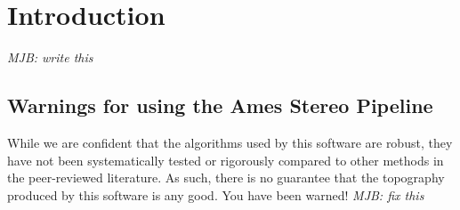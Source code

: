 \chapter{Introduction}

\emph{MJB: write this}

\section{Warnings for using the Ames Stereo Pipeline}

While we are confident that the algorithms used by this software
are robust, they have not been systematically tested or rigorously
compared to other methods in the peer-reviewed literature.  As such,
there is no guarantee that the topography produced by this software 
is any good.  You have been warned! \emph{MJB: fix this}
